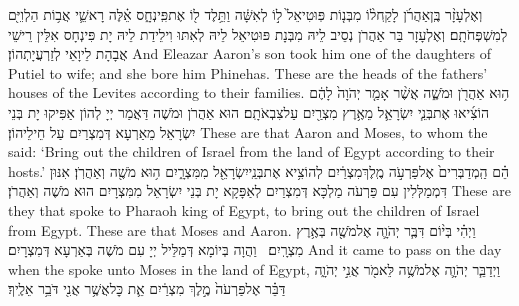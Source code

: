 {וְאֶלְעָזָ֨ר בֶּֽן\maqqaf אַהֲרֹ֜ן לָקַֽח\maqqaf ל֨וֹ מִבְּנ֤וֹת פּֽוּטִיאֵל֙ ל֣וֹ לְאִשָּׁ֔ה וַתֵּ֥לֶד ל֖וֹ אֶת\maqqaf פִּֽינְחָ֑ס אֵ֗לֶּה רָאשֵׁ֛י אֲב֥וֹת הַלְוִיִּ֖ם לְמִשְׁפְּחֹתָֽם׃}
{וְאֶלְעָזָר בַּר אַהֲרֹן נְסֵיב לֵיהּ מִבְּנָת פּוּטִיאֵל לֵיהּ לְאִתּוּ וִילֵידַת לֵיהּ יָת פִּינְחָס אִלֵּין רֵישֵׁי אֲבָהָת לֵיוָאֵי לְזַרְעֲיָתְהוֹן׃}
{And Eleazar Aaron’s son took him one of the daughters of Putiel to wife; and she bore him Phinehas. These are the heads of the fathers’ houses of the Levites according to their families.}{}
{ה֥וּא אַהֲרֹ֖ן וּמֹשֶׁ֑ה אֲשֶׁ֨ר אָמַ֤ר יְהֹוָה֙ לָהֶ֔ם הוֹצִ֜יאוּ אֶת\maqqaf בְּנֵ֧י יִשְׂרָאֵ֛ל מֵאֶ֥רֶץ מִצְרַ֖יִם עַל\maqqaf צִבְאֹתָֽם׃}
{הוּא אַהֲרֹן וּמֹשֶׁה דַּאֲמַר יְיָ לְהוֹן אַפִּיקוּ יָת בְּנֵי יִשְׂרָאֵל מֵאַרְעָא דְּמִצְרַיִם עַל חֵילֵיהוֹן׃}
{These are that Aaron and Moses, to whom the \lord\space said: ‘Bring out the children of Israel from the land of Egypt according to their hosts.’}{}
{הֵ֗ם הַֽמְדַבְּרִים֙ אֶל\maqqaf פַּרְעֹ֣ה מֶֽלֶךְ\maqqaf מִצְרַ֔יִם לְהוֹצִ֥יא אֶת\maqqaf בְּנֵֽי\maqqaf יִשְׂרָאֵ֖ל מִמִּצְרָ֑יִם ה֥וּא מֹשֶׁ֖ה וְאַהֲרֹֽן׃}
{אִנּוּן דִּמְמַלְּלִין עִם פַּרְעֹה מַלְכָּא דְּמִצְרַיִם לְאַפָּקָא יָת בְּנֵי יִשְׂרָאֵל מִמִּצְרָיִם הוּא מֹשֶׁה וְאַהֲרֹן׃}
{These are they that spoke to Pharaoh king of Egypt, to bring out the children of Israel from Egypt. These are that Moses and Aaron.}{}
{וַיְהִ֗י בְּי֨וֹם דִּבֶּ֧ר יְהֹוָ֛ה אֶל\maqqaf מֹשֶׁ֖ה בְּאֶ֥רֶץ מִצְרָֽיִם׃ \setuma }
{וַהֲוָה בְּיוֹמָא דְּמַלֵּיל יְיָ עִם מֹשֶׁה בְּאַרְעָא דְּמִצְרָיִם׃}
{And it came to pass on the day when the \lord\space spoke unto Moses in the land of Egypt,}{}
{וַיְדַבֵּ֧ר יְהֹוָ֛ה אֶל\maqqaf מֹשֶׁ֥ה לֵּאמֹ֖ר אֲנִ֣י יְהֹוָ֑ה דַּבֵּ֗ר אֶל\maqqaf פַּרְעֹה֙ מֶ֣לֶךְ מִצְרַ֔יִם אֵ֛ת כׇּל\maqqaf אֲשֶׁ֥ר אֲנִ֖י דֹּבֵ֥ר אֵלֶֽיךָ׃}
